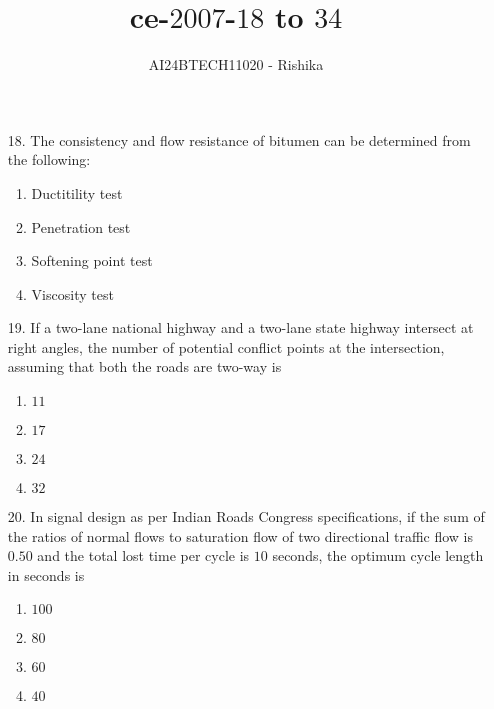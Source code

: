 \documentclass[journal,12pt,onecolumn]{IEEEtran}
\theoremstyle{remark}
\begin{document}

\vspace{3cm}

\title{ce-$2007$-$18$ to $34$}
\author{AI24BTECH11020 - Rishika}
\maketitle
\bigskip
\renewcommand{\thefigure}{\theenumi}
\renewcommand{\thetable}{\theenumi}
\begin{enumerate}
	\item[18.] The consistency and flow resistance of bitumen can be determined from the following:
	\begin{enumerate}
		\item Ductitility test
		\item Penetration test
		\item Softening point test
		\item Viscosity test
	\end{enumerate}
\item[19.] If a two-lane national highway and a two-lane state highway intersect at right angles, the number of potential conflict points at the intersection, assuming that both the roads are two-way is 
	\begin{enumerate}
                \item $11$
                \item $17$
		\item $24$
                \item $32$
        \end{enumerate}
\item[20.] In signal design as per Indian Roads Congress specifications, if the sum of the ratios of normal flows to saturation flow of two directional traffic flow is $0.50$ and the total lost time per cycle is $10$ seconds, the optimum cycle length in seconds is 
	\begin{enumerate}
                \item $100$
                \item $80$
                \item $60$
                \item $40$
        \end{enumerate}

\end{enumerate}
\end{document}
